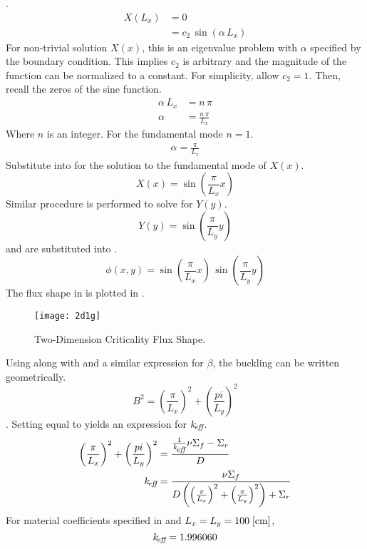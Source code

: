  .
  \begin{align}
    X(L_x) &= 0 \\
    &= c_2 \, \sin(\alpha \, L_x)
  \end{align}
  For non-trivial solution $X(x)$, this is an eigenvalue problem with $\alpha$
  specified by the boundary condition. This implies $c_2$ is arbitrary and the
  magnitude of the function can be normalized to a constant. For simplicity,
  allow $c_2 = 1$. Then, recall the zeros of the sine function.
  \begin{align}
    \alpha \, L_x &= n \, \pi \\
    \alpha &= \frac{n \, \pi}{L_x}
  \end{align}
  Where $n$ is an integer. For the fundamental mode $n=1$.
  \begin{align}
    \label{eq:2d1g_x_alpha}
    \alpha = \frac{\pi}{L_x}
  \end{align}
  Substitute  into  for the solution
  to the fundamental mode of $X(x)$.
  \begin{equation}
    \label{eq:2d1g_x_solution}
    X(x) = \sin\left(\frac{\pi}{L_x} x \right)
  \end{equation}
  Similar procedure is performed to solve for $Y(y)$.
  \begin{equation}
    \label{eq:2d1g_y_solution}
    Y(y) = \sin\left(\frac{\pi}{L_y} y \right)
  \end{equation}
   and  are substituted into
  .
  \begin{equation}
    \label{eq:analytic_2d1g}
    \phi(x,y) = \sin\left(\frac{\pi}{L_x} x\right) \, 
      \sin\left(\frac{\pi}{L_y} y\right)
  \end{equation}
  The flux shape in  is plotted in .
  \begin{figure}
    \centering
    \texttt{[image: 2d1g]}
    \caption{Two-Dimension Criticality Flux Shape.}
    \label{fig:2d1g}
  \end{figure}
  Using  along with  and a
  similar expression for $\beta$, the buckling can be written geometrically.
  \begin{equation}
    \label{eq:2d1g_buckle_geom}
    B^2 = \left(\frac{\pi}{L_x}\right)^2 + \left(\frac{pi}{L_y}\right)^2
  \end{equation}.
  Setting  equal to  yields an
  expression for $k_{\!\mbox{\scriptsize \em eff}}$.
  \begin{align}
    \left(\frac{\pi}{L_x}\right)^2 + \left(\frac{pi}{L_y}\right)^2 &=
      \frac{\frac{1}{k_{\!\mbox{\scriptsize \em eff}}} \nu \Sigma_f - \Sigma_r}{D} \\
    k_{\!\mbox{\scriptsize \em eff}} &= \frac{\nu \Sigma_f}{D \left( \left(\frac{\pi}{L_x}\right)^2 + 
      \left( \frac{\pi}{L_y}\right)^2 \right) + \Sigma_r}
  \end{align}
  For material coefficients specified in  and
  $L_x=L_y=100 \;\text{[{cm}]}$, 
  \begin{equation}
    \label{eq:keff2d}
    k_{\!\mbox{\scriptsize \em eff}} = 1.996060
  \end{equation}
  
